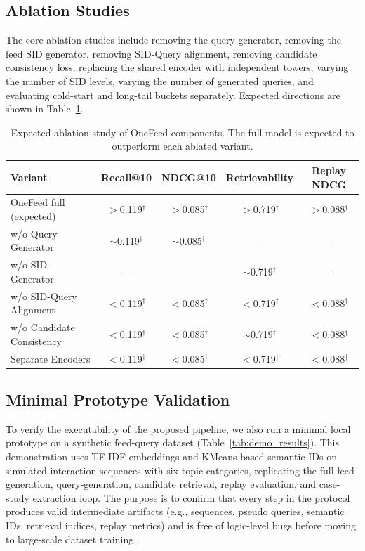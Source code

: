 \documentclass[11pt]{article}
\begin{document}
\subsection{Ablation Studies}

The core ablation studies include removing the query generator, removing the feed SID generator, removing SID-Query alignment, removing candidate consistency loss, replacing the shared encoder with independent towers, varying the number of SID levels, varying the number of generated queries, and evaluating cold-start and long-tail buckets separately. Expected directions are shown in Table~\ref{tab:ablation}.

\begin{table}[t]
\centering
\caption{Expected ablation study of OneFeed components. The full model is expected to outperform each ablated variant.}
\label{tab:ablation}
\begin{tabular}{lcccc}
\toprule
Variant & Recall@10 & NDCG@10 & Retrievability & Replay NDCG \\
\midrule
OneFeed full (expected) & $>$0.119$^\dagger$ & $>$0.085$^\dagger$ & $>$0.719$^\dagger$ & $>$0.088$^\dagger$ \\
w/o Query Generator & $\sim$0.119$^\dagger$ & $\sim$0.085$^\dagger$ & $-$ & $-$ \\
w/o SID Generator & $-$ & $-$ & $\sim$0.719$^\dagger$ & $-$ \\
w/o SID-Query Alignment & $<$0.119$^\dagger$ & $<$0.085$^\dagger$ & $<$0.719$^\dagger$ & $<$0.088$^\dagger$ \\
w/o Candidate Consistency & $<$0.119$^\dagger$ & $<$0.085$^\dagger$ & $\sim$0.719$^\dagger$ & $<$0.088$^\dagger$ \\
Separate Encoders & $<$0.119$^\dagger$ & $<$0.085$^\dagger$ & $<$0.719$^\dagger$ & $<$0.088$^\dagger$ \\
\bottomrule
\end{tabular}
\end{table}

\subsection{Minimal Prototype Validation}

To verify the executability of the proposed pipeline, we also run a minimal local prototype on a synthetic feed-query dataset (Table~\ref{tab:demo_results}). This demonstration uses TF-IDF embeddings and KMeans-based semantic IDs on simulated interaction sequences with six topic categories, replicating the full feed-generation, query-generation, candidate retrieval, replay evaluation, and case-study extraction loop. The purpose is to confirm that every step in the protocol produces valid intermediate artifacts (e.g., sequences, pseudo queries, semantic IDs, retrieval indices, replay metrics) and is free of logic-level bugs before moving to large-scale dataset training.
\end{document}
